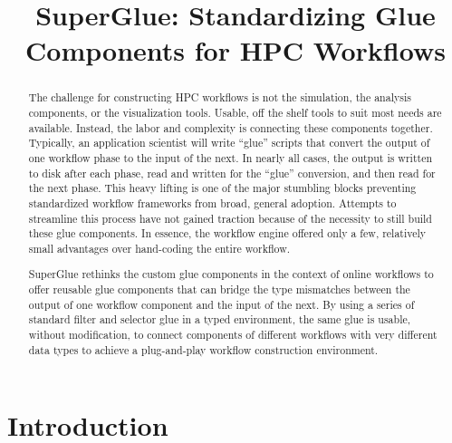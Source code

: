 \documentclass[conference]{IEEEtran}
\begin{document}
\title{SuperGlue: Standardizing Glue Components for HPC Workflows}

\author{

}

\maketitle

\begin{abstract}

The challenge for constructing HPC workflows is not the simulation, the
analysis components, or the visualization tools. Usable, off the shelf tools to
suit most needs are available. Instead, the labor and complexity is connecting
these components together. Typically, an application scientist will write
``glue'' scripts that convert the output of one workflow phase to the input of
the next.  In nearly all cases, the output is written to disk after each
phase, read and written for the ``glue'' conversion, and then read for the next
phase. This heavy lifting is one of the major stumbling blocks preventing
standardized workflow frameworks from broad, general adoption. Attempts to
streamline this process have not gained traction because of the necessity to
still build these glue components. In essence, the workflow engine offered only
a few, relatively small advantages over hand-coding the entire workflow.

SuperGlue rethinks the custom glue components in the context of online
workflows to offer reusable glue components that can bridge the type mismatches
between the output of one workflow component and the input of the next. By
using a series of standard filter and selector glue in a typed environment, the
same glue is usable, without modification, to connect components of different
workflows with very different data types to achieve a plug-and-play workflow
construction environment.

\end{abstract}



\section{Introduction}
\label{s:intro}
\end{document}
